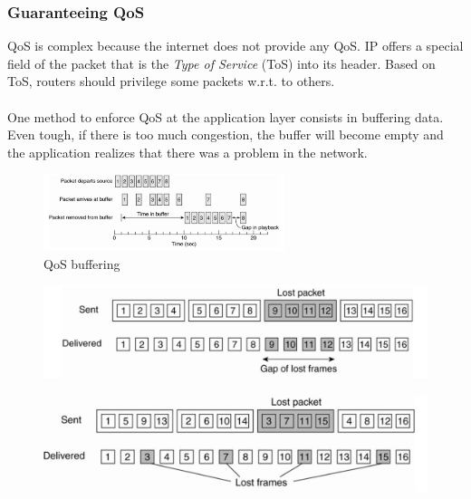 \documentclass[10pt,a4paper]{article}
\begin{document}
\subsubsection{Guaranteeing QoS}
QoS is complex because the internet does not provide any QoS. IP offers a special field of the packet that is the \textit{Type of Service} (ToS) into its header. Based on ToS, routers should privilege some packets w.r.t. to others.\\ \\
One method to enforce QoS at the application layer consists in buffering data. Even tough, if there is too much congestion, the buffer will become empty and the application realizes that there was a problem in the network.
 \begin{figure}[h!]
 \hfill \includegraphics[width=200pt]{images/qos-buffering.png}\hspace*{\fill}
 \caption{QoS buffering}
  \label{fig:qos-buffering}
\end{figure}
  \begin{figure}[h!]
\centering
\begin{minipage}{.5\textwidth}
  \centering
  \includegraphics[width=.9\linewidth]{images/qos-forw-err.png}
  \label{fig:qos-forw-err}
\end{minipage}%
\begin{minipage}{.5\textwidth}
  \centering
  \includegraphics[width=.9\linewidth]{images/qos-interleaving.png}
  \label{fig:qos-interleaving}
\end{minipage}
\end{figure}
\end{document}

